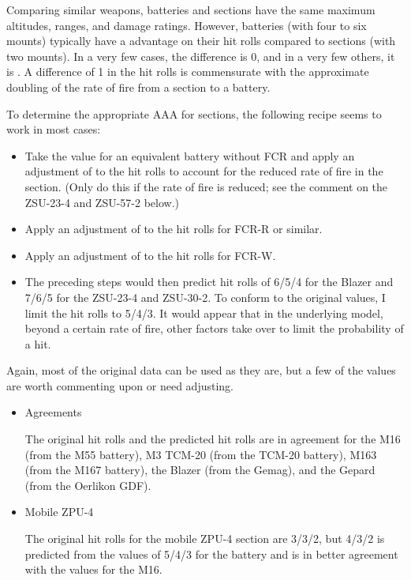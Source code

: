\documentclass[10pt]{article}
\begin{document}
{    Comparing similar weapons, batteries and sections have the same maximum altitudes, ranges, and damage ratings.
    However, batteries (with four to six mounts) typically have a  advantage on their hit rolls compared to sections (with two mounts).
    In a very few cases, the difference is 0, and in a very few others, it is .
    A difference of 1 in the hit rolls is commensurate with the approximate doubling of the rate of fire from a section to a battery.

    To determine the appropriate AAA for sections, the following recipe seems to work in most cases:
    \begin{itemize}
        \item Take the value for an equivalent battery without FCR and apply an adjustment of  to the hit rolls to account for the reduced rate of fire in the section. (Only do this if the rate of fire is reduced; see the comment on the ZSU-23-4 and ZSU-57-2 below.)
        \item Apply an adjustment of  to the hit rolls for FCR-R or similar.
        \item Apply an adjustment of  to the hit rolls for FCR-W.
        \item The preceding steps would then predict hit rolls of 6/5/4 for the Blazer and 7/6/5 for the ZSU-23-4 and ZSU-30-2. To conform to the original values, I limit the hit rolls to 5/4/3. It would appear that in the underlying model, beyond a certain rate of fire, other factors take over to limit the probability of a hit.
    \end{itemize}


    Again, most of the original data can be used as they are, but a few of the values are worth commenting upon or need adjusting.
    \begin{itemize}
        \item Agreements

            The original hit rolls and the predicted hit rolls are in agreement for the M16 (from the M55 battery), M3 TCM-20 (from the TCM-20 battery), M163 (from the M167 battery), the Blazer (from the Gemag), and the Gepard (from the Oerlikon GDF).

        \item Mobile ZPU-4

            The original hit rolls for the mobile ZPU-4 section are 3/3/2, but 4/3/2 is predicted from the values of 5/4/3 for the battery and is in better agreement with the values for the M16.


\end{itemize}}
\end{document}
